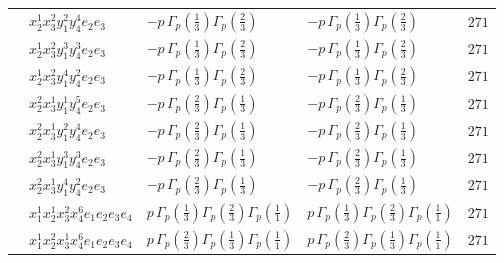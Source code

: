 \documentclass[11pt]{article}
\begin{document}
\begin{table}[ht]
{\begin{tabular}{@{}lllll@{}}
 & $x_{2}^{1} x_{3}^{2} y_{1}^{2} y_{4}^{4} e_{2} e_{3}$ & $- p \, \Gamma_p \left( \frac{1}{3} \right) \Gamma_p \left( \frac{2}{3} \right)$ & $- p \, \Gamma_p \left( \frac{1}{3} \right) \Gamma_p \left( \frac{2}{3} \right)$ & $271$ \\
 & $x_{2}^{1} x_{3}^{2} y_{1}^{3} y_{4}^{3} e_{2} e_{3}$ & $- p \, \Gamma_p \left( \frac{1}{3} \right) \Gamma_p \left( \frac{2}{3} \right)$ & $- p \, \Gamma_p \left( \frac{1}{3} \right) \Gamma_p \left( \frac{2}{3} \right)$ & $271$ \\
 & $x_{2}^{1} x_{3}^{2} y_{1}^{4} y_{4}^{2} e_{2} e_{3}$ & $- p \, \Gamma_p \left( \frac{1}{3} \right) \Gamma_p \left( \frac{2}{3} \right)$ & $- p \, \Gamma_p \left( \frac{1}{3} \right) \Gamma_p \left( \frac{2}{3} \right)$ & $271$ \\
 & $x_{2}^{2} x_{3}^{1} y_{1}^{1} y_{4}^{5} e_{2} e_{3}$ & $- p \, \Gamma_p \left( \frac{2}{3} \right) \Gamma_p \left( \frac{1}{3} \right)$ & $- p \, \Gamma_p \left( \frac{2}{3} \right) \Gamma_p \left( \frac{1}{3} \right)$ & $271$ \\
 & $x_{2}^{2} x_{3}^{1} y_{1}^{2} y_{4}^{4} e_{2} e_{3}$ & $- p \, \Gamma_p \left( \frac{2}{3} \right) \Gamma_p \left( \frac{1}{3} \right)$ & $- p \, \Gamma_p \left( \frac{2}{3} \right) \Gamma_p \left( \frac{1}{3} \right)$ & $271$ \\
 & $x_{2}^{2} x_{3}^{1} y_{1}^{3} y_{4}^{3} e_{2} e_{3}$ & $- p \, \Gamma_p \left( \frac{2}{3} \right) \Gamma_p \left( \frac{1}{3} \right)$ & $- p \, \Gamma_p \left( \frac{2}{3} \right) \Gamma_p \left( \frac{1}{3} \right)$ & $271$ \\
 & $x_{2}^{2} x_{3}^{1} y_{1}^{4} y_{4}^{2} e_{2} e_{3}$ & $- p \, \Gamma_p \left( \frac{2}{3} \right) \Gamma_p \left( \frac{1}{3} \right)$ & $- p \, \Gamma_p \left( \frac{2}{3} \right) \Gamma_p \left( \frac{1}{3} \right)$ & $271$ \\
 & $x_{1}^{1} x_{2}^{1} x_{3}^{2} x_{4}^{6}  e_{1} e_{2} e_{3} e_{4}$ & $p \, \Gamma_p \left( \frac{1}{3} \right) \Gamma_p \left( \frac{2}{3} \right) \Gamma_p \left( \frac{1}{1} \right)$ & $p \, \Gamma_p \left( \frac{1}{3} \right) \Gamma_p \left( \frac{2}{3} \right) \Gamma_p \left( \frac{1}{1} \right)$ & $271$ \\
 & $x_{1}^{1} x_{2}^{2} x_{3}^{1} x_{4}^{6}  e_{1} e_{2} e_{3} e_{4}$ & $p \, \Gamma_p \left( \frac{2}{3} \right) \Gamma_p \left( \frac{1}{3} \right) \Gamma_p \left( \frac{1}{1} \right)$ & $p \, \Gamma_p \left( \frac{2}{3} \right) \Gamma_p \left( \frac{1}{3} \right) \Gamma_p \left( \frac{1}{1} \right)$ & $271$ \\

\end{tabular}}
\end{table}
\end{document}
